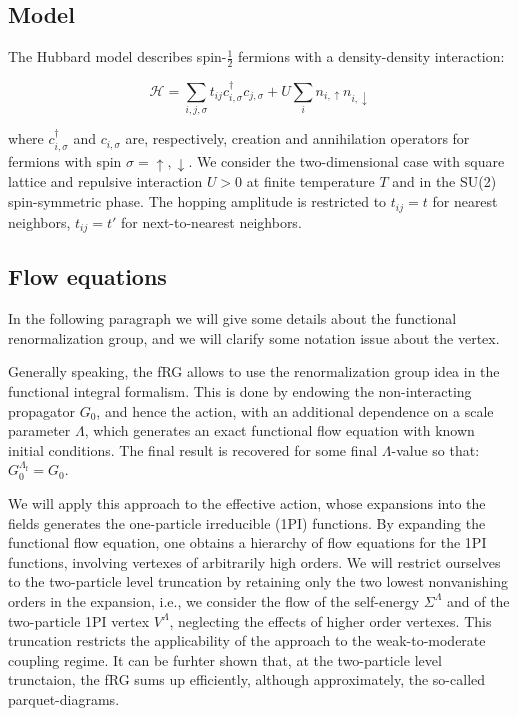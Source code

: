 
\subsection{Model}

The Hubbard model\cite{Hubbard1963} describes spin-$\frac{1}{2}$ fermions with a density-density interaction:

\begin{equation}
\mathcal{H} = \sum_{i,j,\sigma} t_{ij} c^{\dagger}_{i,\sigma} c_{j,\sigma} + U \sum_{i} n_{i,\uparrow} n_{i,\downarrow}
\end{equation}

where $c^{\dagger}_{i,\sigma}$ and $c_{i,\sigma}$ are, respectively, creation and annihilation operators 
for fermions with spin $\sigma=\uparrow,\downarrow$. We consider the two-dimensional case with square lattice and repulsive interaction $U>0$ at finite temperature $T$ and in the SU(2) spin-symmetric phase. The hopping amplitude is restricted to $t_{ij} = t$ for nearest neighbors, $t_{ij}=t'$ for next-to-nearest neighbors.


\subsection{Flow equations}


In the following paragraph we will give some details about the functional renormalization group\cite{Metzner2012,Platt2013}, and we will clarify some notation issue about the vertex. 

Generally speaking, the fRG allows to use the renormalization group idea in the functional integral formalism. 
This is done by endowing the non-interacting propagator $G_0$, and hence the action, with an additional dependence on a scale parameter $\Lambda$, which generates an exact functional flow equation\cite{Wetterich1993} with known initial conditions. The final result is recovered for some final $\Lambda$-value so that: $G_0^{\Lambda_\mathrm{f}} = G_0$. 

We will apply this approach to the effective action, whose expansions into the fields generates the one-particle irreducible (1PI)  functions. By expanding the functional flow equation, one obtains a hierarchy of flow equations for the 1PI functions, involving vertexes of arbitrarily  high orders. 
We will restrict ourselves to the two-particle level truncation by retaining only the two lowest nonvanishing orders in the expansion, i.e., we consider the flow of the self-energy $\Sigma^\Lambda$ and of the two-particle 1PI vertex $V^\Lambda$, neglecting the effects of higher order vertexes. 
This truncation restricts the applicability of the approach to the weak-to-moderate coupling regime\cite{Salmhofer2001}. 
It can be furhter shown that, at the two-particle level trunctaion, the fRG sums up efficiently, although approximately, the so-called parquet-diagrams\cite{Binz2002,Binz2003,Kugler2017}. 

